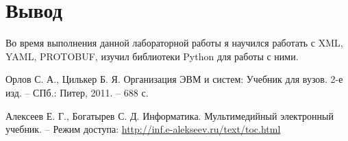 \section{Вывод}
Во время выполнения данной лабораторной работы я научился работать с XML, YAML, PROTOBUF,
изучил библиотеки Python для работы с ними.

\clearpage
\begin{thebibliography}{9}
\bibitem{} Орлов С. А., Цилькер Б. Я. Организация ЭВМ и систем: Учебник для вузов. 2-е изд. -- СПб.: Питер, 2011. -- 688 с.

\bibitem{} Алексеев Е. Г., Богатырев С. Д. Информатика. Мультимедийный электронный учебник. – Режим доступа: \url{http://inf.e-alekseev.ru/text/toc.html}

\end{thebibliography}